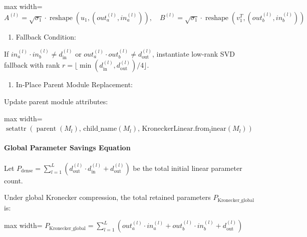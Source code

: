 \begin{center}
\begin{adjustbox}{max width=\columnwidth}
$\displaystyle
A^{(l)} = \sqrt{\sigma_1} \cdot \operatorname{reshape}(u_1, (out_a^{(l)}, in_a^{(l)})), \quad B^{(l)} = \sqrt{\sigma_1} \cdot \operatorname{reshape}(v_1^T, (out_b^{(l)}, in_b^{(l)}))
$
\end{adjustbox}
\end{center}

\begin{enumerate}
\item Fallback Condition:
\end{enumerate}
If $in_a^{(l)} \cdot in_b^{(l)} \ne d_{\text{in}}^{(l)}$ or $out_a^{(l)} \cdot out_b^{(l)} \ne d_{\text{out}}^{(l)}$, instantiate low-rank SVD fallback with rank $r = \lfloor \min(d_{\text{in}}^{(l)}, d_{\text{out}}^{(l)}) / 4 \rfloor$.

\begin{enumerate}
\item In-Place Parent Module Replacement:
\end{enumerate}
Update parent module attributes:

\begin{center}
\begin{adjustbox}{max width=\columnwidth}
$\displaystyle
\operatorname{setattr}\left( \operatorname{parent}(M_l), \, \text{child\_name}(M_l), \, \operatorname{KroneckerLinear.from_linear}(M_l) \right)
$
\end{adjustbox}
\end{center}

\paragraph{Global Parameter Savings Equation}
Let $P_{\text{dense}} = \sum_{l=1}^L (d_{\text{out}}^{(l)} \cdot d_{\text{in}}^{(l)} + d_{\text{out}}^{(l)})$ be the total initial linear parameter count.

Under global Kronecker compression, the total retained parameters $P_{\text{Kronecker\_global}}$ is:

\begin{center}
\begin{adjustbox}{max width=\columnwidth}
$\displaystyle
P_{\text{Kronecker\_global}} = \sum_{l=1}^{L} \left( out_a^{(l)} \cdot in_a^{(l)} + out_b^{(l)} \cdot in_b^{(l)} + d_{\text{out}}^{(l)} \right)
$
\end{adjustbox}
\end{center}

